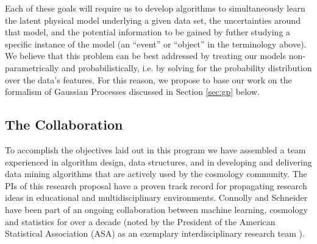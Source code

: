 \documentclass[useAMS,usenatbib,tightenlines,11pt,preprint]{aastex}
\begin{document}





Each of these goals will require us to develop algorithms to simultaneously
learn the latent physical model underlying a given data set, the uncertainties
around that model, and the potential information to be gained by futher studying
a specific instance of the model (an ``event'' or ``object'' in the 
terminology above).
We believe that this problem can be best addressed by treating our models
non-parametrically and probabilistically, 
i.e. by solving for the probability distribution over the data's features.
For this reason, we propose to base our work on the formalism of Gaussian
Processes discussed in Section \ref{sec:gp} below.

\subsection{The Collaboration}

To accomplish the objectives laid out in this program we have
assembled a team experienced in algorithm design, data structures, and
in developing and delivering data mining algorithms that are actively
used by the cosmology community. The PIs of this research proposal
have a proven track record for propagating research ideas in
educational and multidisciplinary environments. Connolly and Schneider
have been part of an ongoing collaboration between machine learning,
cosmology and statistics for over a decade (noted by the President
of the American Statistical Association (ASA) as an exemplary
interdisciplinary research team \cite{straf03}).
\end{document}
